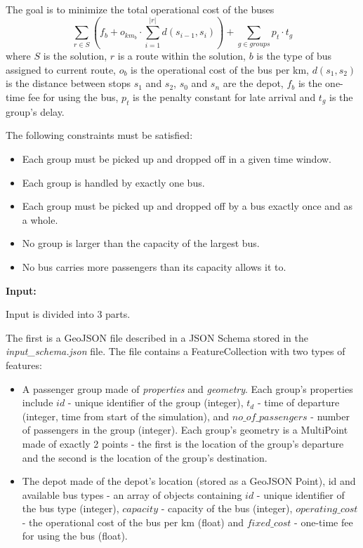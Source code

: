 



The goal is to minimize the total operational cost of the buses
\begin{equation}\label{eq:fitness}
    \sum_{r \in S} ( f_b + o_{km_b} \cdot \sum_{i=1}^{|r|}d(s_{i-1},s_{i})) + \sum_{g \in groups} p_t \cdot t_g
\end{equation}
where $S$ is the solution, $r$ is a route within the solution, $b$ is the type of bus assigned to current route, $o_b$ is the operational cost of the bus per km, $d(s_1, s_2)$ is the distance between stops $s_1$ and $s_2$, $s_0$ and $s_n$ are the depot, $f_b$ is the one-time fee for using the bus, $p_t$ is the penalty constant for late arrival and $t_g$ is the group's delay.

The following constraints must be satisfied:
\begin{itemize}
    \item Each group must be picked up and dropped off in a given time window.
    \item Each group is handled by exactly one bus.
    \item Each group must be picked up and dropped off by a bus exactly once and as a whole.
    \item No group is larger than the capacity of the largest bus.
    \item No bus carries more passengers than its capacity allows it to.
\end{itemize}


\textbf{Input:}

Input is divided into 3 parts.

The first is a GeoJSON file described in a JSON Schema stored in the \textit{input\_schema.json} file. The file contains a FeatureCollection with two types of features:
\begin{itemize}
    \item A passenger group made of \textit{properties} and \textit{geometry}. Each group's properties include $id$ - unique identifier of the group (integer), $t_d$ - time of departure (integer, time from start of the simulation), and $no\_of\_passengers$ - number of passengers in the group (integer). Each group's geometry is a MultiPoint made of exactly 2 points - the first is the location of the group's departure and the second is the location of the group's destination.
    \item The depot made of the depot's location (stored as a GeoJSON Point), id and available bus types - an array of objects containing $id$ - unique identifier of the bus type (integer), $capacity$ - capacity of the bus (integer), $operating\_cost$ - the operational cost of the bus per km (float) and $fixed\_cost$ - one-time fee for using the bus (float).
\end{itemize}

